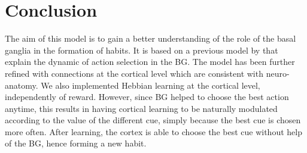 \section{Conclusion}

The aim of this model is to gain a better understanding of the role of the
basal ganglia in the formation of habits. It is based on a previous model by
\citet{Guthrie:2013} that explain the dynamic of action selection in the BG.
The model has been further refined with connections at the cortical level which
are consistent with neuro-anatomy. We also implemented Hebbian learning at the
cortical level, independently of reward. However, since BG helped to choose the
best action anytime, this results in having cortical learning to be naturally
modulated according to the value of the different cue, simply because the best
cue is chosen more often. After learning, the cortex is able to choose the best
cue without help of the BG, hence forming a new habit.


